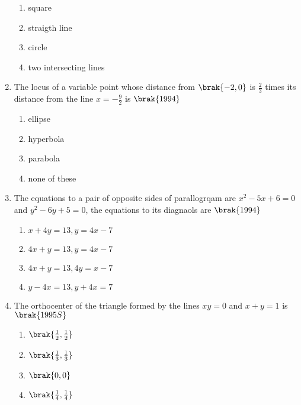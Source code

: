 \begin{enumerate}
\begin{enumerate}
        \item square
        \item straigth line
        \item circle
        \item two intersecting lines
    
\end{enumerate}
\item The locus of a variable point whose distance from $\brak{-2,0}$ is $\frac{2}{3}$ times its distance from the line $x=-\frac{9}{2}$ is
\hfill{$\brak{1994}$}
\begin{enumerate}
    
       \item ellipse
       \item hyperbola
       \item parabola
       \item none of these
    
\end{enumerate}
\item The equations to a pair of opposite sides of parallogrqam are $x^2-5x+6=0$ and $y^2-6y+5=0$, the equations to its diagnaols are 
\hfill{$\brak{1994}$}
\begin{enumerate}
    
      \item $x+4y=13,y=4x-7$
    \item $4x+y=13,y=4x-7$
      \item $4x+y=13,4y=x-7$
        \item $y-4x=13,y+4x=7$
    
\end{enumerate}
\item The orthocenter of the triangle formed by the lines $xy=0$ and $x+y=1$ is 
\hfill{$\brak{1995S}$}
\begin{enumerate}
    
      \item $\brak{\frac{1}{2},\frac{1}{2}}$
      \item $\brak{\frac{1}{3},\frac{1}{3}}$
      \item $\brak{0,0}$
      \item $\brak{\frac{1}{4},\frac{1}{4}}$
    

\end{enumerate}
\end{enumerate}
